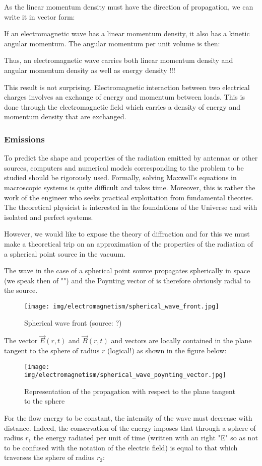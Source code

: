 	As the linear momentum density must have the direction of propagation, we can write it in vector form:
	
	If an electromagnetic wave has a linear momentum density, it also has a kinetic angular momentum. The angular momentum per unit volume is then:
	
	Thus, an electromagnetic wave carries both linear momentum density and angular momentum density as well as energy density !!!

	This result is not surprising. Electromagnetic interaction between two electrical charges involves an exchange of energy and momentum between loads. This is done through the electromagnetic field which carries a density of energy and momentum density that are exchanged.
		
	\pagebreak
	\subsubsection{Emissions}
	To predict the shape and properties of the radiation emitted by antennas or other sources, computers and numerical models corresponding to the problem to be studied should be rigorously used. Formally, solving Maxwell's equations in macroscopic systems is quite difficult and takes time. Moreover, this is rather the work of the engineer who seeks practical exploitation from fundamental theories. The theoretical physicist is interested in the foundations of the Universe and with isolated and perfect systems.

	However, we would like to expose the theory of diffraction and for this we must make a theoretical trip on an approximation of the properties of the radiation of a spherical point source in the vacuum.

	The wave in the case of a spherical point source propagates spherically in space (we speak then of "") and the Poynting vector of is therefore obviously radial to the source.
	\begin{figure}[H]
		\centering
		\texttt{[image: img/electromagnetism/spherical\_wave\_front.jpg]}
		\caption{Spherical wave front (source: ?)}
	\end{figure}
	The vector $\vec{E}(r,t)$ and $\vec{B}(r,t)$ and vectors are locally contained in the plane tangent to the sphere of radius $r$ (logical!) as shown in the figure below:
	\begin{figure}[H]
		\centering
		\texttt{[image: img/electromagnetism/spherical\_wave\_poynting\_vector.jpg]}
		\caption[]{Representation of the propagation with respect to the plane tangent to the sphere}
	\end{figure}
	For the flow energy to be constant, the intensity of the wave must decrease with distance. Indeed, the conservation of the energy imposes that through a sphere of radius $r_1$ the energy radiated per unit of time (written with an right "E" so as not to be confused with the notation of the electric field) is equal to that which traverses the sphere of radius $r_2$:
	
